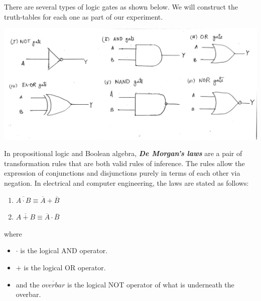 \clearpage
\noindent
There are several types of logic gates as shown below. We will construct the truth-tables for each one as part of our experiment.
\begin{center}
    \includegraphics[scale = 0.2]{Documents/1615794012333.jpg}
\end{center}
\noindent
In propositional logic and Boolean algebra, \textbf{\emph{De Morgan's laws}} are a pair of transformation rules that are both valid rules of inference. The rules allow the expression of conjunctions and disjunctions purely in terms of each other via negation.
\newline
\noindent
In electrical and computer engineering, the laws are stated as follows:
\begin{enumerate}
    \item $\overline{A \cdot B} \equiv \overline{A} + \overline{B}$
    \item $\overline{A + B} \equiv \overline{A} \cdot \overline{B}$
\end{enumerate}
where 
\begin{itemize}
    \item $\cdot$ is the logical AND operator.
    \item $+$ is the logical OR operator.
    \item and the $\overline{overbar}$ is the logical NOT operator of what is underneath the overbar.
\end{itemize}
